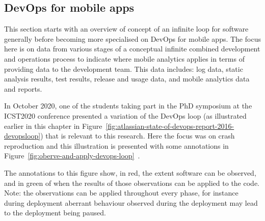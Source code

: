 \subsection{DevOps for mobile apps}
This section starts with an overview of  concept of an infinite loop for software generally before becoming more specialised on DevOps for mobile apps. %
The focus here is on data from various stages of a conceptual infinite combined development and operations process to indicate where mobile analytics applies in terms of providing data to the development team. This data includes: log data, static analysis results, test results, release and usage data, and mobile analytics data and reports.

In October 2020, one of the students taking part in the PhD symposium at the ICST2020 conference presented a variation of the DevOps loop (as illustrated earlier in this chapter in Figure~\ref{fig:atlassian-state-of-devops-report-2016-devopsloop}) that is relevant to this research. Here the focus was on crash reproduction and this illustration is presented with some annotations in Figure~\ref{fig:oberve-and-apply-devops-loop}~. %


The annotations to this figure show, in red, the extent software can be observed, and in green of when the results of those observations can be applied to the code. Note: the observations can be applied throughout every phase, for instance during deployment aberrant behaviour observed during the deployment may lead to the deployment being paused.

